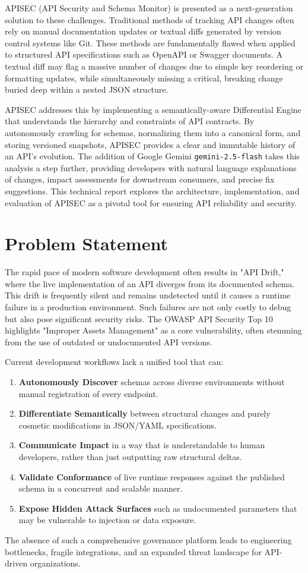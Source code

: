 \documentclass{fisatprojectfinal}
\begin{document}
APISEC (API Security and Schema Monitor) is presented as a next-generation solution to these challenges. Traditional methods of tracking API changes often rely on manual documentation updates or textual diffs generated by version control systems like Git. These methods are fundamentally flawed when applied to structured API specifications such as OpenAPI or Swagger documents. A textual diff may flag a massive number of changes due to simple key reordering or formatting updates, while simultaneously missing a critical, breaking change buried deep within a nested JSON structure.

APISEC addresses this by implementing a semantically-aware Differential Engine that understands the hierarchy and constraints of API contracts. By autonomously crawling for schemas, normalizing them into a canonical form, and storing versioned snapshots, APISEC provides a clear and immutable history of an API's evolution. The addition of Google Gemini \texttt{gemini-2.5-flash} takes this analysis a step further, providing developers with natural language explanations of changes, impact assessments for downstream consumers, and precise fix suggestions. This technical report explores the architecture, implementation, and evaluation of APISEC as a pivotal tool for ensuring API reliability and security.

\section{Problem Statement}
The rapid pace of modern software development often results in "API Drift," where the live implementation of an API diverges from its documented schema. This drift is frequently silent and remains undetected until it causes a runtime failure in a production environment. Such failures are not only costly to debug but also pose significant security risks. The OWASP API Security Top 10 highlights "Improper Assets Management" as a core vulnerability, often stemming from the use of outdated or undocumented API versions.

Current development workflows lack a unified tool that can:
\begin{enumerate}
    \item \textbf{Autonomously Discover} schemas across diverse environments without manual registration of every endpoint.
    \item \textbf{Differentiate Semantically} between structural changes and purely cosmetic modifications in JSON/YAML specifications.
    \item \textbf{Communicate Impact} in a way that is understandable to human developers, rather than just outputting raw structural deltas.
    \item \textbf{Validate Conformance} of live runtime responses against the published schema in a concurrent and scalable manner.
    \item \textbf{Expose Hidden Attack Surfaces} such as undocumented parameters that may be vulnerable to injection or data exposure.
\end{enumerate}
The absence of such a comprehensive governance platform leads to engineering bottlenecks, fragile integrations, and an expanded threat landscape for API-driven organizations.
\end{document}
